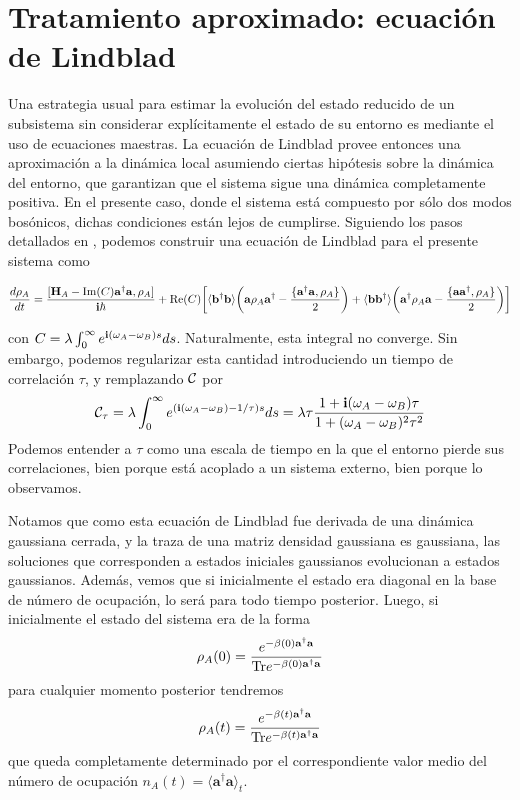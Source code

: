 \documentclass{report} %
\numberwithin{equation}{section}
\begin{document}
\section{Tratamiento aproximado: ecuaci\'on de Lindblad}\label{sec3_3TratamientoApproximado}

Una estrategia usual para estimar la evolución del estado reducido de un subsistema sin considerar explícitamente el estado de su entorno es mediante el uso de ecuaciones maestras. La ecuación de Lindblad provee entonces una aproximación a la dinámica local asumiendo ciertas hipótesis sobre la dinámica del entorno, que garantizan que el sistema sigue una dinámica completamente positiva. En el presente caso, donde el sistema está compuesto por sólo dos modos bosónicos, dichas condiciones están lejos de cumplirse.
Siguiendo los pasos detallados en \cite{HeinzPetruccione}, podemos construir una ecuación de Lindblad para el presente sistema como

 \begin{equation}
\frac{d\rho_A}{dt}=\frac{[{\bf H}_A-\Im(C) {\mathbf a}^\dagger {\mathbf a},\rho_A]}{{\bf i}\hbar } +  \Re(C)  \bigg[
  \langle {\mathbf b}^\dagger{\mathbf b}\rangle
\bigg({\mathbf a} \rho_A{\mathbf a}^\dagger - \frac{\{{\mathbf a}^\dagger{\mathbf a},\rho_A\}}{2}\bigg)
+\langle {\mathbf b}{\mathbf b}^\dagger\rangle
\bigg({\mathbf a}^\dagger \rho_A{\mathbf a} - \frac{\{{\mathbf a}{\mathbf a}^\dagger,\rho_A\}}{2}\bigg)
\bigg]\label{eq:lindbladbosA}
\end{equation}

con $C=\lambda \int_{0}^{\infty} e^{{\bf i} (\omega_A-\omega_B)s}ds$. Naturalmente, esta integral no converge. Sin embargo, podemos regularizar esta cantidad introduciendo un tiempo de correlación $\tau$, y remplazando ${\cal C}$ por
$${\cal C}_\tau=\lambda\int_{0}^{\infty} e^{({\bf i} (\omega_A-\omega_B)-1/\tau) s}ds=\lambda\tau\frac{1+{\bf i}(\omega_A-\omega_B)\tau}{1+(\omega_A-\omega_B)^2\tau^2}$$
Podemos entender a $\tau$ como una escala de tiempo en la que el entorno pierde sus correlaciones, bien porque está acoplado a un sistema externo, bien porque lo observamos.


Notamos que como esta ecuación de Lindblad fue derivada de una dinámica gaussiana cerrada, y la traza de una matriz densidad gaussiana es gaussiana, las soluciones que corresponden a estados iniciales gaussianos evolucionan a estados gaussianos. Además, vemos que si inicialmente el estado era diagonal en la base de número de ocupación, lo será para todo tiempo posterior. Luego, si inicialmente el estado del sistema era de la forma
$$
\rho_A(0)=\frac{e^{-\beta(0){\mathbf a}^\dagger {\mathbf a}}}{{\Tr}e^{-\beta(0){\mathbf a}^\dagger {\mathbf a}}}
$$
para cualquier momento posterior tendremos
$$
\rho_A(t)=\frac{e^{-\beta(t){\mathbf a}^\dagger {\mathbf a}}}{{\Tr}e^{-\beta(t){\mathbf a}^\dagger {\mathbf a}}}
$$
que queda completamente determinado por el correspondiente valor medio del número de ocupación $n_A(t)=\langle{\mathbf a}^\dagger{\mathbf a}\rangle_t$.
\end{document}

